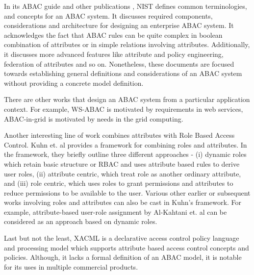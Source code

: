 	
    In its ABAC guide \cite{nist-abac-draft} and other publications \cite{hu2015attribute},  NIST defines common terminologies, and concepts for an ABAC system. It discusses required components, considerations and architecture for designing an  enterprise ABAC system. It acknowledges the fact that ABAC rules can be quite complex in boolean combination of attributes or in simple relations involving attributes. Additionally, it discusses more advanced features like attribute and policy engineering, federation of attributes and so on. Nonetheless, these documents are focused towards establishing general definitions and considerations of an ABAC system without providing a concrete model definition.
	
	There are other works that design an ABAC system from a particular application context. For example, WS-ABAC \cite{abac-ws}  is motivated by requirements in web services, ABAC-in-grid \cite{grid-abac}  is motivated by needs in the grid computing.
	

	
	Another interesting line of work combines attributes with Role Based Access Control. Kuhn et. al \cite{kuhn2010adding} provides a framework for combining roles and attributes. In the framework, they briefly outline three different approaches - (i) dynamic roles which retain basic structure or RBAC and  uses attribute based rules to derive user roles, (ii) attribute centric,  which treat role as another ordinary attribute, and (iii) role centric, which uses roles to grant permissions and attributes to reduce permissions to be available to the user. Various other earlier or subsequent works involving roles and attributes can also be cast in Kuhn's framework. For example, attribute-based user-role assignment by Al-Kahtani et. al \cite{al2002model} can be considered as an approach based on dynamic roles.
	
	Last but not the least, XACML \cite{xacml} is a declarative access control policy language and processing model which  supports attribute based access control concepts and policies. Although, it lacks a formal definition of an ABAC model, it is notable for its uses in multiple commercial products.
	
